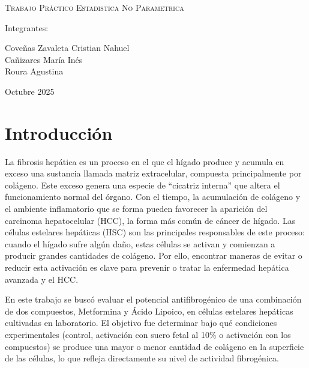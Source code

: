 \documentclass[
  11pt,
]{article}
\author{}
\date{\vspace{-2.5em}}
\begin{document}
\begin{titlepage}
    \centering
     \par 
    \vspace{3cm}
    {\scshape\Huge Trabajo Práctico Estadistica No Parametrica \par}
    \vspace{3cm}
    \vfill
    {\Large Integrantes: \par}
    {\Large Coveñas Zavaleta Cristian Nahuel\\
            Cañizares María Inés\\
            Roura Agustina \par}
    \vfill
    {\large Octubre 2025 \par}
\end{titlepage}

\section{Introducción}\label{introducciuxf3n}

La fibrosis hepática es un proceso en el que el hígado produce y acumula
en exceso una sustancia llamada matriz extracelular, compuesta
principalmente por colágeno. Este exceso genera una especie de
``cicatriz interna'' que altera el funcionamiento normal del órgano. Con
el tiempo, la acumulación de colágeno y el ambiente inflamatorio que se
forma pueden favorecer la aparición del carcinoma hepatocelular (HCC),
la forma más común de cáncer de hígado. Las células estelares hepáticas
(HSC) son las principales responsables de este proceso: cuando el hígado
sufre algún daño, estas células se activan y comienzan a producir
grandes cantidades de colágeno. Por ello, encontrar maneras de evitar o
reducir esta activación es clave para prevenir o tratar la enfermedad
hepática avanzada y el HCC.

En este trabajo se buscó evaluar el potencial antifibrogénico de una
combinación de dos compuestos, Metformina y Ácido Lipoico, en células
estelares hepáticas cultivadas en laboratorio. El objetivo fue
determinar bajo qué condiciones experimentales (control, activación con
suero fetal al 10\% o activación con los compuestos) se produce una
mayor o menor cantidad de colágeno en la superficie de las células, lo
que refleja directamente su nivel de actividad fibrogénica.
\end{document}
